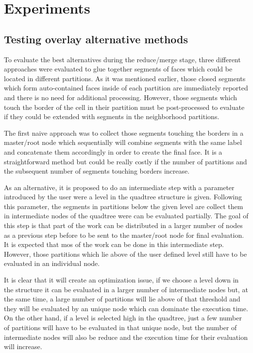 \section{Experiments}

\subsection{Testing overlay alternative methods}
To evaluate the best alternatives during the reduce/merge stage, three different approaches were evaluated to glue together segments of faces which could be located in different partitions.  As it was mentioned earlier, those closed segments which form auto-contained faces inside of each partition are immediately reported and there is no need for additional processing.  However, those segments which touch the border of the cell in their partition must be post-processed to evaluate if they could be extended with segments in the neighborhood partitions.

The first naive approach was to collect those segments touching the borders in a master/root node which sequentially will combine segments with the same label and concatenate them accordingly in order to create the final face.  It is a straightforward method but could be really costly if the number of partitions and the subsequent number of segments touching borders increase.

As an alternative, it is proposed to do an intermediate step with a parameter introduced by the user were a level in the quadtree structure is given.  Following this parameter, the segments in partitions below the given level are collect them in intermediate nodes of the quadtree were can be evaluated partially.  The goal of this step is that part of the work can be distributed in a larger number of nodes as a previous step before to be sent to the master/root node for final evaluation.  It is expected that mos of the work can be done in this intermediate step.  However, those partitions which lie above of the user defined level still have to be evaluated in an individual node.

It is clear that it will create an optimization issue, if we choose a level down in the structure it can be evaluated in a larger number of intermediate nodes but, at the same time, a large number of partitions will lie above of that threshold and they will be evaluated by an unique node which can dominate the execution time.  On the other hand, if a level is selected high in the quadtree, just a few number of partitions will have to be evaluated in that unique node, but the number of intermediate nodes will also be reduce and the execution time for their evaluation will increase.

